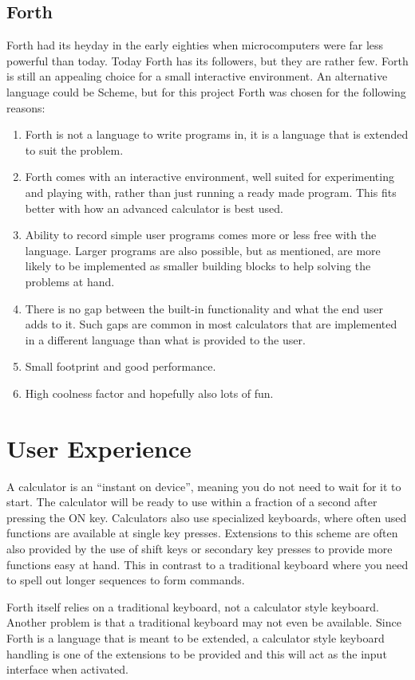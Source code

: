 \documentclass[a4paper]{article}
\begin{document}
\subsection{Forth}
Forth had its heyday in the early eighties when microcomputers were far less powerful than today.
Today Forth has its followers, but they are rather few. Forth is still an appealing choice for a small interactive environment. An alternative language could be Scheme, but for this project Forth was chosen for the following reasons:
\begin{enumerate}
\item Forth is not a language to write programs in, it is a language that is extended to suit the problem.
\item Forth comes with an interactive environment, well suited for experimenting and playing with, rather than just running a ready made program.  This fits better with how an advanced calculator is best used.
\item Ability to record simple user programs comes more or less free with the language. Larger programs are also possible, but as mentioned, are more likely to be implemented as smaller building blocks to help solving the problems at hand.
\item There is no gap between the built-in functionality and what the end user adds to it. Such gaps are common in most calculators that are implemented in a different language than what is provided to the user.
\item Small footprint and good performance.
\item High coolness factor and hopefully also lots of fun.
\end{enumerate}

\section{User Experience}
A calculator is an ``instant on device'', meaning you do not need to wait for it to start. The calculator will be ready to use within a fraction of a second after pressing the ON key. Calculators also use specialized keyboards, where often used functions are available at single key presses. Extensions to this scheme are often also provided by the use of shift keys or secondary key presses to provide more functions easy at hand. This in contrast to a traditional keyboard where you need to spell out longer sequences to form commands.

Forth itself relies on a traditional keyboard, not a calculator style keyboard. Another problem is that a traditional keyboard may not even be available. Since Forth is a language that is meant to be extended, a calculator style keyboard handling is one of the extensions to be provided and this will act as the input interface when activated.
\end{document}
